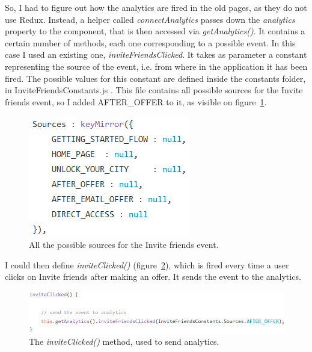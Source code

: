So, I had to figure out how the analytics are fired in the old pages, as they do not use Redux. Instead, a helper called \textit{connectAnalytics} passes down the \textit{analytics} property to the component, that is then accessed via \textit{getAnalytics()}. It contains a certain number of methods, each one corresponding to a possible event. In this case I used an existing one, \textit{inviteFriendsClicked}. It takes as parameter a constant representing the source of the event, i.e. from where in the application it has been fired. The possible values for this constant are defined inside the \guillemotleft{} constants \guillemotright{} folder, in \guillemotleft{} InviteFriendsConstants.js \guillemotright{}. This file contains all possible sources for the Invite friends event, so I added \guillemotleft{} AFTER\_OFFER \guillemotright{} to it, as visible on {\sc figure}~\ref{fig:inviteFriendsConstants}.

\begin{figure}[H]
    \centering
    \includegraphics[scale=0.9]{figure/inviteFriendsConstants.png}
    \caption{All the possible sources for the \guillemotleft{} Invite friends \guillemotright{} event.}
    \label{fig:inviteFriendsConstants}
\end{figure}

I could then define \textit{inviteClicked()} ({\sc figure}~\ref{fig:inviteClicked}), which is fired every time a user clicks on Invite friends after making an offer. It sends the event to the analytics. 

\begin{figure}[H]
    \centering
    \includegraphics[scale=0.9]{figure/inviteClicked.png}
    \caption{The \textit{inviteClicked()} method, used to send analytics.}
    \label{fig:inviteClicked}
\end{figure}

